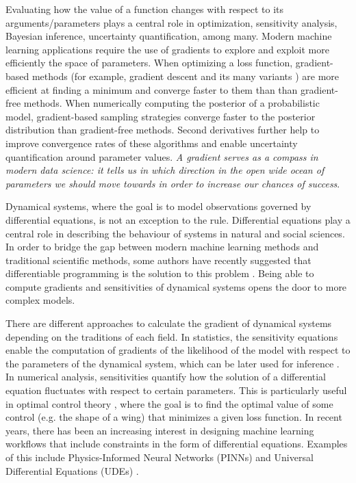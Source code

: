 

Evaluating how the value of a function changes with respect to its arguments/parameters plays a central role in optimization, sensitivity analysis, Bayesian inference, uncertainty quantification, among many. 
Modern machine learning applications require the use of gradients to explore and exploit more efficiently the space of parameters. 
When optimizing a loss function, gradient-based methods (for example, gradient descent and its many variants \cite{ruder2016overview-gradient-descent}) are more efficient at finding a minimum and converge faster to them than than gradient-free methods.
When numerically computing the posterior of a probabilistic model, gradient-based sampling strategies converge faster to the posterior distribution than gradient-free methods. 
Second derivatives further help to improve convergence rates of these algorithms and enable uncertainty quantification around parameter values.
\textit{A gradient serves as a compass in modern data science: it tells us in which direction in the open wide ocean of parameters we should move towards in order to increase our chances of success}.  

Dynamical systems, where the goal is to model observations governed by differential equations, is not an exception to the rule.
Differential equations play a central role in describing the behaviour of systems in natural and social sciences. 
In order to bridge the gap between modern machine learning methods and traditional scientific methods, some authors have recently suggested that differentiable programming is the solution to this problem \cite{Ramsundar_Krishnamurthy_Viswanathan_2021, Shen_diff_modelling}. 
Being able to compute gradients and sensitivities of dynamical systems opens the door to more complex models.

There are different approaches to calculate the gradient of dynamical systems depending on the traditions of each field. 
In statistics, the sensitivity equations enable the computation of gradients of the likelihood of the model with respect to the parameters of the dynamical system, which can be later used for inference \cite{ramsay2017dynamic}. 
In numerical analysis, sensitivities quantify how the solution of a differential equation fluctuates with respect to certain parameters. 
This is particularly useful in optimal control theory \cite{Giles_Pierce_2000}, where the goal is to find the optimal value of some control (e.g. the shape of a wing) that minimizes a given loss function. 
In recent years, there has been an increasing interest in designing machine learning workflows that include constraints in the form of differential equations. 
Examples of this include Physics-Informed Neural Networks (PINNs) \cite{PINNs_2019} and Universal Differential Equations (UDEs) \cite{rackauckas2020universal}.  

